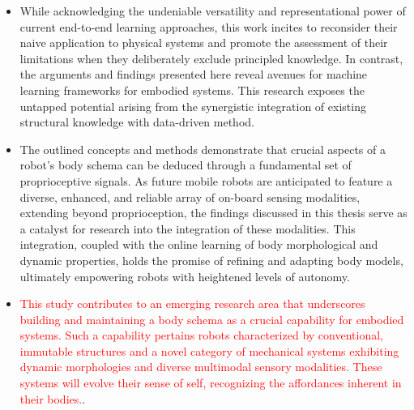 \documentclass[12pt, a4paper]{article}
\newcommand{\redtext}[1]{\textcolor{red}{#1}}
\begin{document}
\begin{itemize}
	
	\item While acknowledging the undeniable versatility and representational power of current end-to-end learning approaches, this work incites to reconsider their naive application to physical systems and promote the assessment of their limitations when they deliberately exclude principled knowledge. In contrast, the arguments and findings presented here reveal avenues for machine learning frameworks for embodied systems. This research exposes the untapped potential arising from the synergistic integration of existing structural knowledge with data-driven method.
	
	\item The outlined concepts and methods demonstrate that crucial aspects of a robot's body schema can be deduced through a fundamental set of proprioceptive signals. As future mobile robots are anticipated to feature a diverse, enhanced, and reliable array of on-board sensing modalities, extending beyond proprioception, the findings discussed in this thesis serve as a catalyst for research into the integration of these modalities. This integration, coupled with the online learning of body morphological and dynamic properties, holds the promise of refining and adapting body models, ultimately empowering robots with heightened levels of autonomy.
	
	\item \redtext{This study contributes to an emerging research area that underscores building and maintaining a body schema as a crucial capability for embodied systems. Such a capability pertains robots characterized by conventional, immutable structures and a novel category of mechanical systems exhibiting dynamic morphologies and diverse multimodal sensory modalities. These systems will evolve their sense of self, recognizing the affordances inherent in their bodies.}.
	
	
	

\end{itemize}
\end{document}
